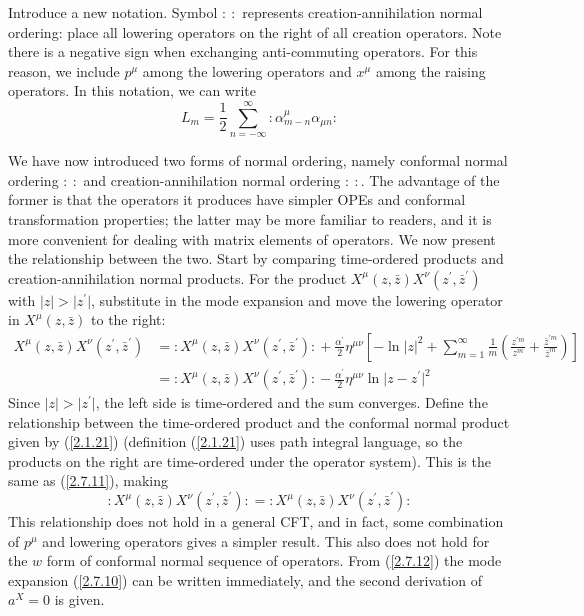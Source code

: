 Introduce a new notation. Symbol $ \mathrel{: \: :}$ represents creation-annihilation normal ordering: place all lowering operators on the right of all creation operators. Note there is a negative sign when exchanging anti-commuting operators.    
For this reason, we include $p^\mu$ among the lowering operators and $x^\mu$ among the raising operators.    
In this notation, we can write    
\begin{equation}\label{2.7.10}
	L_{m}=\frac{1}{2} \sum_{n=-\infty}^{\infty}\mathrel{ : \alpha_{m-n}^{\mu} \alpha_{\mu n} : }
\end{equation}


We have now introduced two forms of normal ordering, namely conformal normal ordering $\mathrel{:\::}$ and creation-annihilation normal ordering $\mathrel{: \: :}$. The advantage of the former is that the operators it produces have simpler OPEs and conformal transformation properties; the latter may be more familiar to readers, and it is more convenient for dealing with matrix elements of operators. We now present the relationship between the two. Start by comparing time-ordered products and creation-annihilation normal products.    
For the product $X^{\mu}(z, \bar{z}) X^{\nu}(z^{\prime}, \bar{z}^{\prime})$ with $\lvert z \rvert >\lvert z^{\prime}\rvert$, substitute in the mode expansion and move the lowering operator in $X^{\mu}(z, \bar{z})$ to the right:    
\begin{align}
	X^{\mu}(z, \bar{z}) X^{\nu}(z^{\prime}, \bar{z}^{\prime}) &= \mathrel{ : X^{\mu}(z, \bar{z}) X^{\nu}(z^{\prime}, \bar{z}^{\prime}) : }  +\frac{\alpha^{\prime}}{2} \eta^{\mu \nu}\left[-\ln |z|^{2}+\sum_{m=1}^{\infty} \frac{1}{m}\left(\frac{z^{\prime m}}{z^{m}}+\frac{\bar{z}^{\prime m}}{\bar{z}^{m}}\right)\right] \nonumber \\
	&=\mathrel{ : X^{\mu}(z, \bar{z}) X^{\nu}(z^{\prime}, \bar{z}^{\prime}) : }-\frac{\alpha^{\prime}}{2} \eta^{\mu \nu}\ln \lvert z-z^\prime\rvert^{2} \label{2.7.11}
\end{align}
Since $|z|>\lvert z^{\prime}\rvert$, the left side is time-ordered and the sum converges.    
Define the relationship between the time-ordered product and the conformal normal product given by (\ref{2.1.21}) (definition (\ref{2.1.21}) uses path integral language, so the products on the right are time-ordered under the operator system). This is the same as (\ref{2.7.11}), making    
\begin{equation}\label{2.7.12}
	\mathrel{ : X^{\mu}(z, \bar{z}) X^{\nu}(z^{\prime}, \bar{z}^{\prime}) : } = \mathrel{: X^{\mu}(z, \bar{z}) X^{\nu}(z^{\prime}, \bar{z}^{\prime})}:
\end{equation}
This relationship does not hold in a general CFT, and in fact, some combination of $p^\mu$ and lowering operators gives a simpler result. This also does not hold for the $w$ form of conformal normal sequence of operators.    
From (\ref{2.7.12}) the mode expansion (\ref{2.7.10}) can be written immediately, and the second derivation of $a^{X}=0$ is given.    

